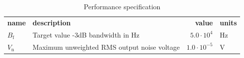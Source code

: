 \begin{table}[h]
\centering
\begin{tabular}[c]{llrl}
\textbf{name} & \textbf{description} & \textbf{value} & \textbf{units} \\ 
\rowcolor{myyellow}
$B_{\mathrm{f}}$ &\small{Target value -3dB bandwidth in Hz} &$5.0 \cdot 10^{4}$ &$\mathrm{Hz}$ \\ 
$V_{\mathrm{n}}$ &\small{Maximum unweighted RMS output noise voltage} &$1.0 \cdot 10^{-5}$ &$\mathrm{V}$ \\ 
\end{tabular}
\caption{Performance specification}
\end{table}



